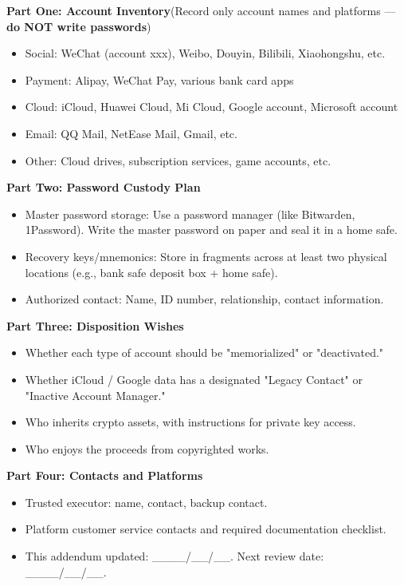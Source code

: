 \textbf{Part One: Account Inventory}(Record only account names and platforms —\textbf{do NOT write passwords})

\begin{itemize}
  \item Social: WeChat (account xxx), Weibo, Douyin, Bilibili, Xiaohongshu, etc.
  \item Payment: Alipay, WeChat Pay, various bank card apps
  \item Cloud: iCloud, Huawei Cloud, Mi Cloud, Google account, Microsoft account
  \item Email: QQ Mail, NetEase Mail, Gmail, etc.
  \item Other: Cloud drives, subscription services, game accounts, etc.
\end{itemize}

\textbf{Part Two: Password Custody Plan}

\begin{itemize}
  \item Master password storage: Use a password manager (like Bitwarden, 1Password). Write the master password on paper and seal it in a home safe.
  \item Recovery keys/mnemonics: Store in fragments across at least two physical locations (e.g., bank safe deposit box + home safe).
  \item Authorized contact: Name, ID number, relationship, contact information.
\end{itemize}

\textbf{Part Three: Disposition Wishes}

\begin{itemize}
  \item Whether each type of account should be "memorialized" or "deactivated."
  \item Whether iCloud / Google data has a designated "Legacy Contact" or "Inactive Account Manager."
  \item Who inherits crypto assets, with instructions for private key access.
  \item Who enjoys the proceeds from copyrighted works.
\end{itemize}

\textbf{Part Four: Contacts and Platforms}

\begin{itemize}
  \item Trusted executor: name, contact, backup contact.
  \item Platform customer service contacts and required documentation checklist.
  \item This addendum updated: \_\_\_\_/\_\_/\_\_. Next review date: \_\_\_\_/\_\_/\_\_.
\end{itemize}

